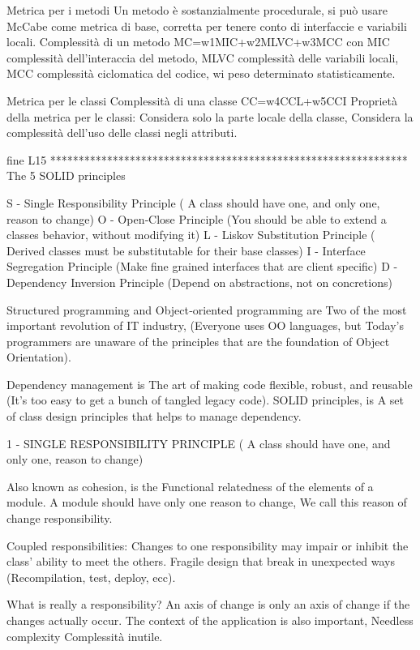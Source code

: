 \documentclass{report}
\begin{document}
Metrica per i metodi
Un metodo è sostanzialmente procedurale, si può usare McCabe come metrica di base, corretta per tenere conto di interfaccie e variabili locali.
Complessità di un metodo MC=w1MIC+w2MLVC+w3MCC
con MIC complessità dell'interaccia del metodo, MLVC complessità delle variabili locali, MCC complessità ciclomatica del codice, wi peso determinato statisticamente.

Metrica per le classi
Complessità di una classe CC=w4CCL+w5CCI
Proprietà della metrica per le classi: Considera solo la parte locale della classe, Considera la complessità dell’uso delle classi negli attributi.

fine L15
***************************************************************
The 5 SOLID principles

S - Single Responsibility Principle ( A class should have one, and only one, reason to change)
O - Open‐Close Principle (You should be able to extend a classes behavior, without modifying it)
L - Liskov Substitution Principle ( Derived classes must be substitutable for their base classes)
I - Interface Segregation Principle (Make fine grained interfaces that are client specific)
D - Dependency Inversion Principle (Depend on abstractions, not on concretions)

Structured programming and Object‐oriented programming are Two of the most important revolution of IT industry,
(Everyone uses OO languages, but Today's programmers are unaware of the principles that are the foundation of Object Orientation).

Dependency management is The art of making code flexible, robust, and reusable (It’s too easy to get a bunch of tangled legacy code).
SOLID principles, is A set of class design principles that helps to manage dependency.


1 - SINGLE RESPONSIBILITY PRINCIPLE ( A class should have one, and only one, reason to change)

Also known as cohesion, is the Functional relatedness of the elements of a module. A module should have only one reason to change, We call this reason of change responsibility.

Coupled responsibilities:
Changes to one responsibility may impair or inhibit the class’ ability to meet the others.
Fragile design that break in unexpected ways (Recompilation, test, deploy, ecc).

What is really a responsibility? An axis of change is only an axis of change if the changes actually occur. The context of the application is also important, Needless complexity Complessità inutile.
\end{document}
